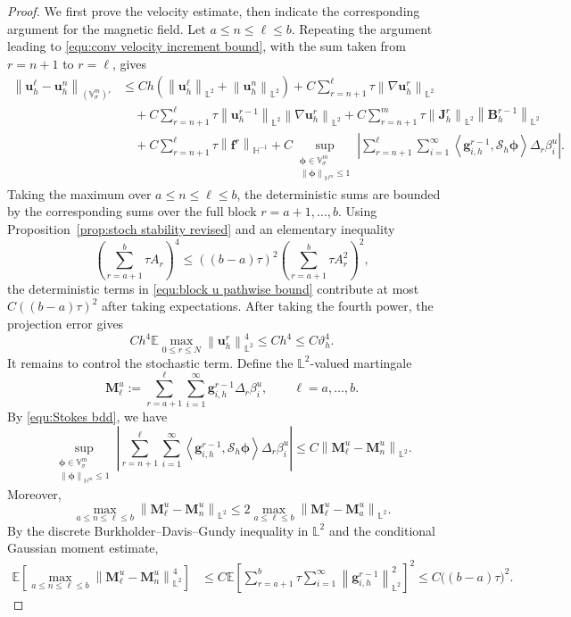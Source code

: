 \documentclass[11pt, reqno]{amsart}
\theoremstyle{definition}
\numberwithin{equation}{section}
\newcommand{\bff}{\boldsymbol}
\newcommand{\bb}{\mathbb}
\newcommand{\norm}[2]{\left\|{#1}\right\|_{#2}}
\newcommand{\inpro}[2]{\left\langle#1,#2\right\rangle}
\newcommand{\abs}[1]{\left|{#1}\right|}
\begin{document}
\begin{proof}
	We first prove the velocity estimate, then indicate the corresponding
	argument for the magnetic field.
	Let $a\le n\le \ell\le b$. Repeating the argument leading to
	\eqref{equ:conv velocity increment bound}, with the sum taken from $r=n+1$ to $r=\ell$, gives
	\begin{align}
		\label{equ:block u pathwise bound}
		\norm{\bff u_h^\ell-\bff u_h^n}{(\bb V^m_\sigma)'}
		&\le
		Ch\left(
		\norm{\bff u_h^\ell}{\bb L^2}
		+
		\norm{\bff u_h^n}{\bb L^2}
		\right)
		+
		C\sum_{r=n+1}^{\ell}\tau\norm{\nabla\bff u_h^r}{\bb L^2}
		\nonumber\\
		&\quad
		+
		C\sum_{r=n+1}^{\ell}\tau
		\norm{\bff u_h^{r-1}}{\bb L^2}
		\norm{\nabla\bff u_h^r}{\bb L^2}
		+
		C\sum_{r=n+1}^{m}\tau
		\norm{\bff J_h^r}{\bb L^2}
		\norm{\bff B_h^{r-1}}{\bb L^2}
		\nonumber\\
		&\quad
		+
		C\sum_{r=n+1}^{\ell}\tau\norm{\bff f^r}{\bb H^{-1}}
		+
		C\sup_{\substack{\bff\phi\in\bb V_\sigma^m\\
				\norm{\bff\phi}{\bb H^m}\le1}}
		\abs{
			\sum_{r=n+1}^{\ell}\sum_{i=1}^{\infty}
			\inpro{\bff g_{i,h}^{r-1}}{\mathcal S_h\bff\phi}
			\Delta_r\beta_i^u
		}.
	\end{align}
	Taking the maximum over $a\le n\le \ell\le b$, the deterministic sums are bounded by the corresponding sums over the full block $r=a+1,\ldots,b$.
	Using Proposition~\ref{prop:stoch stability revised} and an elementary inequality
	\[
	\left(
	\sum_{r=a+1}^{b}\tau A_r
	\right)^4
	\le
	((b-a)\tau)^2
	\left(
	\sum_{r=a+1}^{b}\tau A_r^2
	\right)^2,
	\]
	the deterministic terms
	in \eqref{equ:block u pathwise bound} contribute at most
	\(C((b-a)\tau)^2\) after taking expectations. After taking the fourth power, the projection error gives
	\[
	C h^4
	\bb E
	\max_{0\le r\le N}\norm{\bff u_h^r}{\bb L^2}^{4}
	\le
	Ch^4
	\le
	C\vartheta_h^4.
	\]
	It remains to control the stochastic term. Define the $\bb L^2$-valued
	martingale
	\[
	\bff M_\ell^u
	:=
	\sum_{r=a+1}^{\ell}\sum_{i=1}^{\infty}
	\bff g_{i,h}^{r-1}\Delta_r\beta_i^u,
	\qquad \ell =a,\ldots,b.
	\]
	By \eqref{equ:Stokes bdd}, we have
	\[
	\sup_{\substack{\bff\phi\in\bb V_\sigma^m\\
			\norm{\bff\phi}{\bb H^m}\le1}}
	\abs{
		\sum_{r=n+1}^{\ell}
		\sum_{i=1}^{\infty}
		\inpro{\bff g_{i,h}^{r-1}}{\mathcal S_h\bff\phi}
		\Delta_r\beta_i^u
	}
	\le
	C\norm{\bff M_\ell^u-\bff M_n^u}{\bb L^2}.
	\]
	Moreover,
	\[
	\max_{a\le n\le \ell\le b}
	\norm{\bff M_\ell^u-\bff M_n^u}{\bb L^2}
	\le
	2\max_{a\le \ell\le b}
	\norm{\bff M_\ell^u-\bff M_a^u}{\bb L^2}.
	\]
	By the discrete Burkholder--Davis--Gundy inequality in $\bb{L}^2$ and the conditional Gaussian moment estimate,
	\begin{align}\label{equ:max M bdg}
		\bb E
		\left[
		\max_{a\le n\le \ell \le b}
		\norm{\bff M_\ell^u-\bff M_n^u}{\bb L^2}^{4}
		\right]
		&\le
		C
		\bb E
		\left[
		\sum_{r=a+1}^{b}\tau
		\sum_{i=1}^{\infty}
		\norm{\bff g_{i,h}^{r-1}}{\bb L^2}^{2}
		\right]^2
		\le
		C\bigl((b-a)\tau\bigr)^2.
	\end{align}
	

\end{proof}
\end{document}

